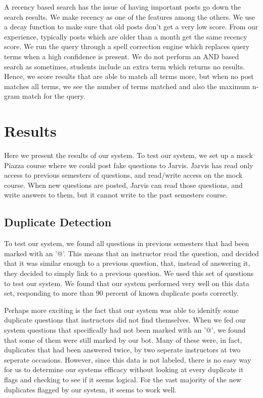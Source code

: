\documentclass[sigconf]{acmart}
\begin{document}
A recency based search has the issue of having important posts go down the search results. We make recency as one of the features among the others. We use a decay function to make sure that old posts don't get a very low score. From our experience, typically posts which are older than a month get the same recency score. We run the query through a spell correction engine which replaces query terms when a high confidence is present. We do not perform an AND based search as sometimes, students include an extra term which returns no results. Hence, we score results that are able to match all terms more, but when no post matches all terms, we see the number of terms matched and also the maximum n-gram match for the query. 

\section{Results}
Here we present the results of our system.
To test our system, we set up a mock Piazza course where we could post fake questions to Jarvis. Jarvis has read only access to previous semesters of questions, and read/write access on the mock course. When new questions are posted, Jarvis can read those questions, and write answers to them, but it cannot write to the past semesters course.

\subsection{Duplicate Detection}
To test our system, we found all questions in previous semesters that had been marked with an '@'. This means that an instructor read the question, and decided that it was similar enough to a previous question, that, instead of answering it, they decided to simply link to a previous question. We used this set of questions to test our system. We found that our system performed very well on this data set, responding to more than 90 percent of known duplicate posts correctly.

Perhaps more exciting is the fact that our system was able to idenitfy some duplicate questions that instructors did not find themselves. When we fed our system questions that specifically had not been marked with an '@', we found that some of them were still marked by our bot. Many of these were, in fact, duplicates that had been answered twice, by two seperate instructors at two seperate occasions. However, since this data is not labeled, there is no easy way for us to determine our systems efficacy without looking at every duplicate it flags and checking to see if it seems logical. For the vast majority of the new duplicates flagged by our system, it seems to work well.
\end{document}

